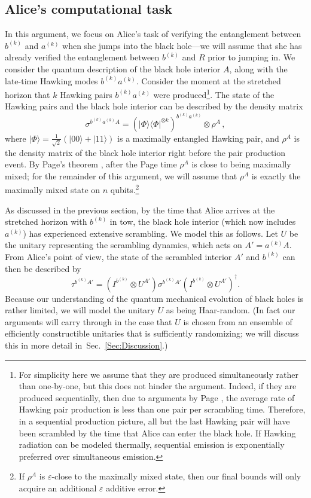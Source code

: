 \documentclass[a4paper,11pt]{article}
\theoremstyle{definition}
\newcommand{\ket}[1]{{|#1\rangle}}
\newcommand{\ketbra}[2]{|#1\rangle\! \langle #2|}
\newcommand{\eps}{\varepsilon}
\newcommand{\Sec}[1]{Sec.~\ref{#1}}
\begin{document}
\subsection{Alice's computational task}

In this argument, we focus on Alice's task of verifying the entanglement between $b^{(k)}$ and $a^{(k)}$ when she jumps into the black hole---we will assume that she has already verified the entanglement between $b^{(k)}$ and $R$ prior to jumping in. We consider the quantum description of the black hole interior $A$, along with the late-time Hawking modes $b^{(k)} a^{(k)}$. 
Consider the moment at the stretched horizon that $k$ Hawking pairs $b^{(k)} a^{(k)}$ were produced\footnote{For simplicity here we assume that they are produced simultaneously rather than one-by-one, but this does not hinder the argument. Indeed, if they are produced sequentially, then due to arguments by Page \cite{Page:1976a,Page:1976b}, the average rate of Hawking pair production is less than one pair per scrambling time.
Therefore, in a sequential production picture, all but the last Hawking pair will have been scrambled by the time that Alice can enter the black hole.
If Hawking radiation can be modeled thermally, sequential emission is exponentially preferred over simultaneous emission.\label{fn:k}}.
The state of the Hawking pairs and the black hole interior can be described by the density matrix
$$
	\sigma^{b^{(k)} a^{(k)} A} = (\ketbra{\Phi}{\Phi}^{\otimes k})^{b^{(k)} a^{(k)}} \otimes \rho^A \, ,
$$
where $\ket{\Phi} = \frac{1}{\sqrt{2}} \left( \ket{00} + \ket{11} \right)$ is a maximally entangled Hawking pair, and $\rho^A$ is the density matrix of the black hole interior right before the pair production event.
By Page's theorem \cite{Page:1993,Page:2013}, after the Page time $\rho^A$ is close to being maximally mixed; for the remainder of this argument, we will assume that $\rho^A$ is exactly the maximally mixed state on $n$ qubits.\footnote{If $\rho^A$ is $\eps$-close to the maximally mixed state, then our final bounds will only acquire an additional $\eps$ additive error.} 

As discussed in the previous section, by the time that Alice arrives at the stretched horizon with $b^{(k)}$ in tow, the black hole interior (which now includes $a^{(k)}$) has experienced extensive scrambling. We model this as follows.
Let $U$ be the unitary representing the scrambling dynamics, which acts on $A' = a^{(k)} A$.
From Alice's point of view, the state of the scrambled interior $A'$ and $b^{(k)}$ can then be described by
$$
	\tau^{b^{(k)} A'} = (I^{b^{(k)}} \otimes U^{A'}) \sigma^{b^{(k)} A'} (I^{b^{(k)}} \otimes U^{A'})^\dagger .
$$
Because our understanding of the quantum mechanical evolution of black holes is rather limited, we will model the unitary $U$ as being Haar-random.
(In fact our arguments will carry through in the case that $U$ is chosen from an ensemble of efficiently constructible unitaries that is sufficiently randomizing; we will discuss this in more detail in~\Sec{Sec:Discussion}.) 
\end{document}
